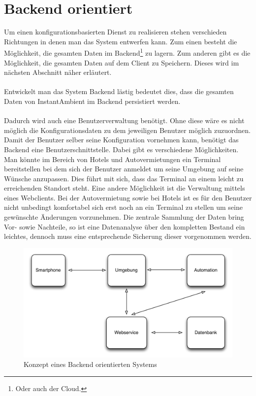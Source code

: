 \section{Backend orientiert}
Um einen konfigurationsbasierten Dienst zu realisieren stehen verschieden Richtungen in denen man das System entwerfen kann. 
Zum einen besteht die Möglichkeit, die gesamten Daten im Backend\footnote{Oder auch der Cloud.} zu lagern. Zum anderen gibt es die Möglichkeit, die gesamten Daten auf dem Client zu Speichern. Dieses wird im nächsten Abschnitt näher erläutert.
\\\\
Entwickelt man das System Backend lästig bedeutet dies, dass die gesamten Daten von InstantAmbient im Backend persistiert werden. 
\\\\
Dadurch wird auch eine Benutzerverwaltung benötigt. Ohne diese wäre es nicht möglich die Konfigurationsdaten zu dem jeweiligen Benutzer möglich zuzuordnen. Damit der Benutzer selber seine Konfiguration vornehmen kann, benötigt das Backend eine Benutzerschnittstelle. Dabei gibt es verschiedene Möglichkeiten. Man könnte im Bereich von Hotels und Autovermietungen ein Terminal bereitstellen bei dem sich der Benutzer anmeldet um seine Umgebung auf seine Wünsche anzupassen. Dies führt mit sich, dass das Terminal an einem leicht zu erreichenden Standort steht. Eine andere Möglichkeit ist die Verwaltung mittels eines Webclients. Bei der Autovermietung sowie bei Hotels ist es für den Benutzer nicht unbedingt komfortabel sich erst noch an ein Terminal zu stellen um seine gewünschte Änderungen vorzunehmen. Die zentrale Sammlung der Daten bring Vor- sowie Nachteile, so ist eine Datenanalyse über den kompletten Bestand ein leichtes, dennoch muss eine entsprechende Sicherung dieser vorgenommen werden. 
\begin{figure}[H]
\includegraphics[width=12.5cm]{images/backend}
\caption{Konzept eines Backend orientierten Systems}
\end{figure}

